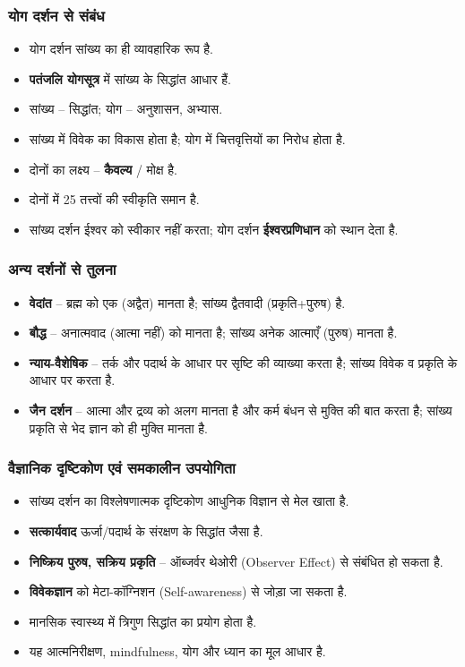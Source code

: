 \begin{frame}[fragile]\frametitle{योग दर्शन से संबंध}
\begin{itemize}
  \item योग दर्शन सांख्य का ही व्यावहारिक रूप है.
  \item \textbf{पतंजलि योगसूत्र} में सांख्य के सिद्धांत आधार हैं.
  \item सांख्य – सिद्धांत; योग – अनुशासन, अभ्यास.
  \item सांख्य में विवेक का विकास होता है; योग में चित्तवृत्तियों का निरोध होता है.
  \item दोनों का लक्ष्य – \textbf{कैवल्य} / मोक्ष है.
  \item दोनों में 25 तत्त्वों की स्वीकृति समान है.
  \item सांख्य दर्शन ईश्वर को स्वीकार नहीं करता; योग दर्शन \textbf{ईश्वरप्रणिधान} को स्थान देता है.
\end{itemize}
\end{frame}

\begin{frame}[fragile]\frametitle{अन्य दर्शनों से तुलना}
\begin{itemize}
  \item \textbf{वेदांत} – ब्रह्म को एक (अद्वैत) मानता है; सांख्य द्वैतवादी (प्रकृति+पुरुष) है.
  \item \textbf{बौद्ध} – अनात्मवाद (आत्मा नहीं) को मानता है; सांख्य अनेक आत्माएँ (पुरुष) मानता है.
  \item \textbf{न्याय-वैशेषिक} – तर्क और पदार्थ के आधार पर सृष्टि की व्याख्या करता है; सांख्य विवेक व प्रकृति के आधार पर करता है.
  \item \textbf{जैन दर्शन} – आत्मा और द्रव्य को अलग मानता है और कर्म बंधन से मुक्ति की बात करता है; सांख्य प्रकृति से भेद ज्ञान को ही मुक्ति मानता है.
\end{itemize}
\end{frame}

\begin{frame}[fragile]\frametitle{वैज्ञानिक दृष्टिकोण एवं समकालीन उपयोगिता}
\begin{itemize}
  \item सांख्य दर्शन का विश्लेषणात्मक दृष्टिकोण आधुनिक विज्ञान से मेल खाता है.
  \item \textbf{सत्कार्यवाद} ऊर्जा/पदार्थ के संरक्षण के सिद्धांत जैसा है.
  \item \textbf{निष्क्रिय पुरुष, सक्रिय प्रकृति} – ऑब्जर्वर थेओरी (Observer Effect) से संबंधित हो सकता है.
  \item \textbf{विवेकज्ञान} को मेटा-कॉग्निशन (Self-awareness) से जोड़ा जा सकता है.
  \item मानसिक स्वास्थ्य में त्रिगुण सिद्धांत का प्रयोग होता है.
  \item यह आत्मनिरीक्षण, mindfulness, योग और ध्यान का मूल आधार है.
\end{itemize}
\end{frame}

